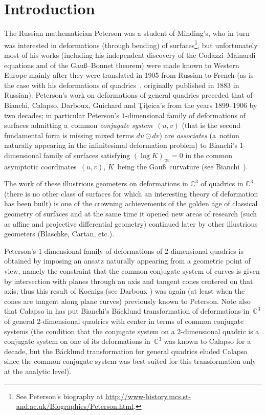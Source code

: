 \section{Introduction}

The Russian mathematician Peterson was a student of Minding's, who
in turn was interested in deformations (through bending) of
surfaces\footnote{See Peterson's biography at \url{http://www-history.mcs.st-and.ac.uk/Biographies/Peterson.html}.}, but unfortunately most of his works
(including his independent discovery of the Codazzi--Mainardi
equations and of the Gau\ss--Bonnet theorem) were made known to
Western Europe mainly after they were translated in 1905 from
Russian to French (as is the case with his deformations of
quadrics~\cite{P}, originally published in 1883 in Russian).
Peterson's work on deformations of general quadrics preceded that
of Bianchi, Calapso, Darboux, Guichard and \c{T}i\c{t}eica's from
the years 1899--1906 by two decades; in particu\-lar Peterson's
$1$-dimensional family of deformations of surfaces admitting a~common {\it conjugate system}~$(u,v)$ (that is the second
fundamental form is missing mixed terms $du\odot dv$) are {\it
associates} (a~notion naturally appearing in the inf\/initesimal
deformation problem) to Bianchi's $1$-dimensional family of
surfaces satisfying $(\log K)_{uv}=0$ in the common asymptotic
coordinates~$(u,v)$, $K$~being the Gau\ss\ curvature (see Bianchi~\cite[Vol.~2, \S\S~294, 295]{B1}).

The work of these illustrious geometers on deformations in
$\mathbb{C}^3$ of quadrics in $\mathbb{C}^3$ (there is no other
class of surfaces for which an interesting theory of deformation
has been built) is one of the crowning achievements of the golden
age of classical geometry of surfaces and at the same time it
opened new areas of research (such as af\/f\/ine and projective
dif\/ferential geometry) continued later by other illustrious
geometers (Blaschke, Cartan, etc.).

Peterson's $1$-dimensional family of deformations of
$2$-dimensional quadrics is obtained by imposing an ansatz
naturally appearing from a geometric point of view, namely the
constraint that the common conjugate system of curves is given by
intersection with planes through an axis and tangent cones
centered on that axis; thus this result of Koenigs (see Darboux
\cite[\S\S~91--101]{D}) was again (at least when the cones are
tangent along plane curves) previously known to Peterson. Note
also that Calapso in \cite{Ca} has put Bianchi's B\"{a}cklund
transformation of deformations in~$\mathbb{C}^3$ of general
$2$-dimensional quadrics with center in terms of common conjugate
systems (the condition that the conjugate system on a
$2$-dimensional quadric is a conjugate system on one of its
deformations in~$\mathbb{C}^3$ was known to Calapso for a decade,
but the B\"{a}cklund transformation for general quadrics eluded
Calapso since the common conjugate system was best suited for this
transformation only at the analytic level).

